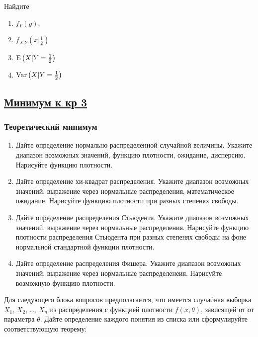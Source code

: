 \begin{enumerate}
Найдите
\begin{enumerate}
\item $f_{Y}(y)$,
\item $f_{X|Y}\left(x|\frac{1}{2}\right)$
\item $\operatorname{E}\left(X|Y = \frac{1}{2}\right)$
\item $\operatorname{Var}\left(X|Y = \frac{1}{2}\right)$
\end{enumerate}

\end{enumerate}




\subsection[Минимум к кр 3]{\hyperref[sec:sol_minimum_kr_03]{Минимум к кр 3}}
\label{sec:minimum_kr_03}



\subsubsection*{Теоретический минимум}

\begin{enumerate}
  \item Дайте определение нормально распределённой случайной величины. Укажите диапазон возможных значений, функцию плотности, ожидание, дисперсию. Нарисуйте функцию плотности.
  \item Дайте определение хи-квадрат распределения. Укажите диапазон возможных значений, выражение через нормальные распределения, математическое ожидание. Нарисуйте функцию плотности при разных степенях свободы.
  \item Дайте определение распределения Стьюдента. Укажите диапазон возможных значений, выражение через нормальные распределения. Нарисуйте функцию плотности распределения Стьюдента при разных степенях свободы на фоне нормальной стандартной функции плотности.
  \item Дайте определение распределения Фишера. Укажите диапазон возможных значений, выражение через нормальные распределенеия. Нарисуйте возможную функцию плотности.
\end{enumerate}

Для следующего блока вопросов предполагается, что
имеется случайная выборка $X_1$, $X_2$, \ldots, $X_n$ из распределения
с функцией плотности $f(x, \theta)$, зависящей от от параметра $\theta$. Дайте определение каждого понятия из списка или сформулируйте соответствующую теорему:


